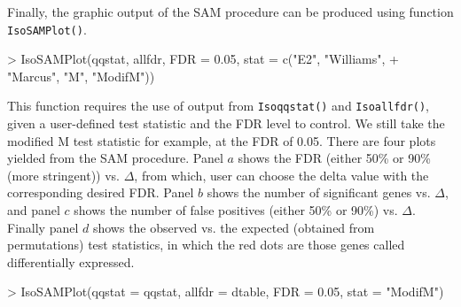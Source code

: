 \documentclass[10pt]{mybook4}
\begin{document}
Finally, the graphic output of the SAM procedure can be produced using function \texttt{IsoSAMPlot()}.

\begin{Schunk}
\begin{Sinput}
> IsoSAMPlot(qqstat, allfdr, FDR = 0.05, stat = c("E2", "Williams", 
+     "Marcus", "M", "ModifM"))
\end{Sinput}
\end{Schunk}

This function requires the use of output from \texttt{Isoqqstat()} and \texttt{Isoallfdr()}, given a user-defined test statistic
and the FDR level to control. We still take the modified M test statistic for example, at the FDR of 0.05. There are four plots
yielded from the SAM procedure. Panel $a$ shows the FDR (either 50\% or 90\% (more stringent)) vs. $\Delta$, from which, user can choose the delta value with
the corresponding desired FDR. Panel $b$ shows the number of significant genes vs. $\Delta$, and panel $c$ shows the number of false positives (either 50\% or 90\%) vs. $\Delta$. Finally panel $d$ shows the observed vs. the expected (obtained from permutations) test statistics, in which the red dots are those genes called differentially expressed.

\begin{Schunk}
\begin{Sinput}
> IsoSAMPlot(qqstat = qqstat, allfdr = dtable, FDR = 0.05, stat = "ModifM")
\end{Sinput}
\end{Schunk}

 
  
\clearpage
\newpage
\end{document}
